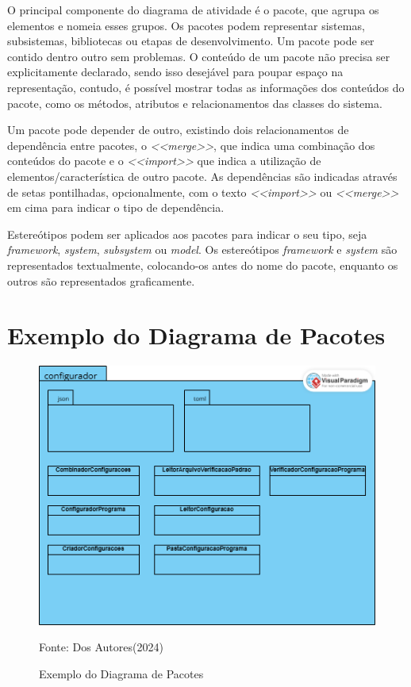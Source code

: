 \documentclass[12pt,openright,oneside,a4paper,
	chapter=TITLE,
	section=TITLE,
	english,brazil]{abntex2}
\begin{document}
O principal componente do diagrama de atividade é o pacote, que agrupa os elementos e nomeia esses grupos. Os pacotes podem representar sistemas, subsistemas, bibliotecas ou etapas de desenvolvimento. Um pacote pode ser contido dentro outro sem problemas. O conteúdo de um pacote não precisa ser explicitamente declarado, sendo isso desejável para poupar espaço na representação, contudo, é possível mostrar todas as informações dos conteúdos do pacote, como os métodos, atributos e relacionamentos das classes do sistema.

Um pacote pode depender de outro, existindo dois relacionamentos de dependência entre pacotes, o \textit{<<merge>>}, que indica uma combinação dos conteúdos do pacote  e o \textit{<<import>>} que indica a utilização de elementos/característica de outro pacote.  As dependências são indicadas através de setas pontilhadas, opcionalmente, com o texto \textit{<<import>>} ou \textit{<<merge>>} em cima para indicar o tipo de dependência.

Estereótipos podem ser aplicados aos pacotes para indicar o seu tipo, seja \textit{framework}, \textit{system}, \textit{subsystem} ou \textit{model}. Os estereótipos \textit{framework} e \textit{system} são representados textualmente, colocando-os antes do nome do pacote, enquanto os outros são representados graficamente.

\section{Exemplo do Diagrama de Pacotes}

\begin{figure}[!htp]
	\caption{Exemplo do Diagrama de Pacotes}
	\centering
	\includegraphics[scale=0.5]{img/ExemploDiagramaPacotes.png}
	\\

	\label{ExemploPacotes}
	\footnotesize\raggedright Fonte: Dos Autores(2024)
\end{figure}
\end{document}
